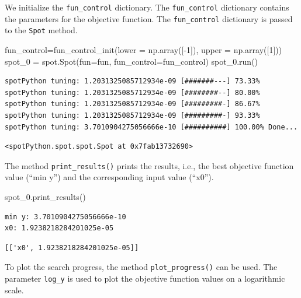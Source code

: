 \documentclass[
  letterpaper,
  DIV=11,
  numbers=noendperiod]{scrreprt}
\newenvironment{Shaded}{\begin{snugshade}}{\end{snugshade}}
\newcommand{\DecValTok}[1]{\textcolor[rgb]{0.68,0.00,0.00}{#1}}
\newcommand{\NormalTok}[1]{\textcolor[rgb]{0.00,0.23,0.31}{#1}}
\newcommand{\OperatorTok}[1]{\textcolor[rgb]{0.37,0.37,0.37}{#1}}
\begin{document}
We initialize the \texttt{fun\_control} dictionary. The
\texttt{fun\_control} dictionary contains the parameters for the
objective function. The \texttt{fun\_control} dictionary is passed to
the \texttt{Spot} method.

\begin{Shaded}
\begin{Highlighting}[]
\NormalTok{fun\_control}\OperatorTok{=}\NormalTok{fun\_control\_init(lower }\OperatorTok{=}\NormalTok{ np.array([}\OperatorTok{{-}}\DecValTok{1}\NormalTok{]),}
\NormalTok{                     upper }\OperatorTok{=}\NormalTok{ np.array([}\DecValTok{1}\NormalTok{]))}
\NormalTok{spot\_0 }\OperatorTok{=}\NormalTok{ spot.Spot(fun}\OperatorTok{=}\NormalTok{fun,}
\NormalTok{                   fun\_control}\OperatorTok{=}\NormalTok{fun\_control)}
\NormalTok{spot\_0.run()}
\end{Highlighting}
\end{Shaded}

\begin{verbatim}
spotPython tuning: 1.2031325085712934e-09 [#######---] 73.33% 
spotPython tuning: 1.2031325085712934e-09 [########--] 80.00% 
spotPython tuning: 1.2031325085712934e-09 [#########-] 86.67% 
spotPython tuning: 1.2031325085712934e-09 [#########-] 93.33% 
spotPython tuning: 3.7010904275056666e-10 [##########] 100.00% Done...
\end{verbatim}

\begin{verbatim}
<spotPython.spot.spot.Spot at 0x7fab13732690>
\end{verbatim}

The method \texttt{print\_results()} prints the results, i.e., the best
objective function value (``min y'') and the corresponding input value
(``x0'').

\begin{Shaded}
\begin{Highlighting}[]
\NormalTok{spot\_0.print\_results()}
\end{Highlighting}
\end{Shaded}

\begin{verbatim}
min y: 3.7010904275056666e-10
x0: 1.9238218284201025e-05
\end{verbatim}

\begin{verbatim}
[['x0', 1.9238218284201025e-05]]
\end{verbatim}

To plot the search progress, the method \texttt{plot\_progress()} can be
used. The parameter \texttt{log\_y} is used to plot the objective
function values on a logarithmic scale.
\end{document}
